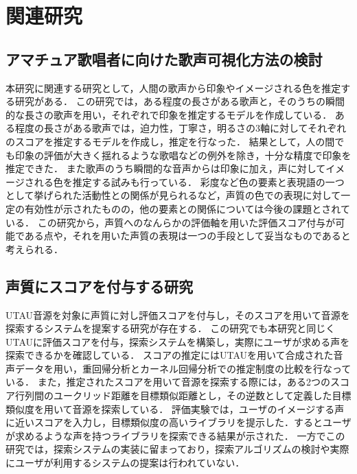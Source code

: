 \documentclass[a4j,8pt,twocolumn]{extarticle}
\begin{document}
\section{関連研究}
\subsection{アマチュア歌唱者に向けた歌声可視化方法の検討}
本研究に関連する研究として，人間の歌声から印象やイメージされる色を推定する研究\cite{ama}がある．
この研究では，ある程度の長さがある歌声と，そのうちの瞬間的な長さの歌声を用い，それぞれで印象を推定するモデルを作成している．
ある程度の長さがある歌声では，迫力性，丁寧さ，明るさの3軸に対してそれぞれのスコアを推定するモデルを作成し，推定を行なった．
結果として，人の間でも印象の評価が大きく揺れるような歌唱などの例外を除き，十分な精度で印象を推定できた．
また歌声のうち瞬間的な音声からは印象に加え，声に対してイメージされる色を推定する試みも行っている．
彩度など色の要素と表現語の一つとして挙げられた活動性との関係が見られるなど，声質の色での表現に対して一定の有効性が示されたものの，他の要素との関係については今後の課題とされている．
この研究から，声質へのなんらかの評価軸を用いた評価スコア付与が可能である点や，それを用いた声質の表現は一つの手段として妥当なものであると考えられる．

\subsection{声質にスコアを付与する研究}
UTAU音源を対象に声質に対し評価スコアを付与し，そのスコアを用いて音源を探索するシステムを提案する研究\cite{ong}が存在する．
この研究でも本研究と同じくUTAUに評価スコアを付与，探索システムを構築し，実際にユーザが求める声を探索できるかを確認している．
スコアの推定にはUTAUを用いて合成された音声データを用い，重回帰分析とカーネル回帰分析での推定制度の比較を行なっている．
また，推定されたスコアを用いて音源を探索する際には，ある2つのスコア行列間のユークリッド距離を目標類似距離とし，その逆数として定義した目標類似度を用いて音源を探索している．
評価実験では，ユーザのイメージする声に近いスコアを入力し，目標類似度の高いライブラリを提示した．するとユーザが求めるような声を持つライブラリを探索できる結果が示された．
一方でこの研究では，探索システムの実装に留まっており，探索アルゴリズムの検討や実際にユーザが利用するシステムの提案は行われていない．
\end{document}
